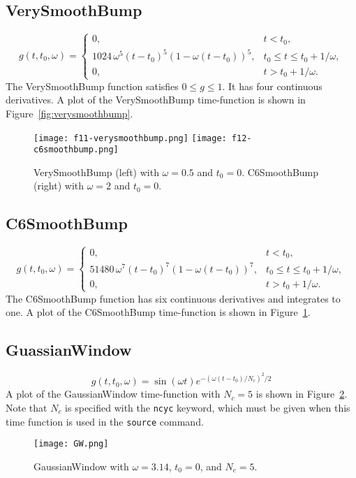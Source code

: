\documentclass[11pt]{report}
\begin{document}
\subsection{VerySmoothBump} 
\[
g(t,t_0,\omega) = \left\{ 
\begin{array}{ll} 
0, & t < t_0,\\ 
1024\,\omega^5(t-t_0)^5 (1 - \omega(t-t_0))^5,& t_0 \leq t \leq t_0+1/\omega,\\ 
0, & t > t_0 + 1/\omega.
\end{array}
\right.
\]
The VerySmoothBump function satisfies $0\leq g\leq 1$. It has four continuous derivatives.
A plot of the VerySmoothBump time-function is shown in Figure~\ref{fig:verysmoothbump}.
\begin{figure}
\begin{centering}
  \texttt{[image: f11-verysmoothbump.png]}
  \texttt{[image: f12-c6smoothbump.png]}
  \caption{VerySmoothBump (left) with $\omega=0.5$ and
    $t_0=0$. C6SmoothBump (right) with $\omega=2$ and $t_0=0$.}
  \label{fig:verysmoothbump}  \label{fig:c6smoothbump}
\end{centering}
\end{figure}  
%
\subsection{C6SmoothBump} 
\[
g(t,t_0,\omega) = \left\{ 
\begin{array}{ll} 
0, & t < t_0,\\ 
51480\, \omega^7 (t-t_0)^7 (1- \omega(t-t_0))^7, & t_0 \leq t \leq t_0 + 1/\omega,\\ 
0, & t > t_0 + 1/\omega.
\end{array}
\right.
\]
The C6SmoothBump function has six continuous derivatives and integrates to one.
A plot of the C6SmoothBump time-function is shown in Figure~\ref{fig:c6smoothbump}.
%
\subsection{GuassianWindow}
\[
g(t,t_0,\omega) = \sin(\omega t) e^{-(\omega(t-t_0)/N_c)^2/2}
\]
A plot of the GaussianWindow time-function with $N_c=5$ is shown in
Figure~\ref{fig:gaussianwindow}. Note that $N_c$ is specified with the \verb+ncyc+ keyword, which
must be given when this time function is used in the \verb+source+ command.
\begin{figure}
\begin{centering}
  \texttt{[image: GW.png]}
  \caption{GaussianWindow with $\omega=3.14$, $t_0=0$, and $N_c=5$.}
  \label{fig:gaussianwindow}
\end{centering}
\end{figure}  
\end{document}
